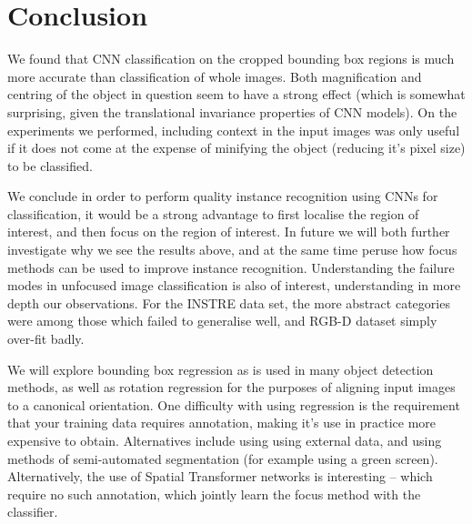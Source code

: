 \section{Conclusion}

We found that CNN classification on the cropped bounding box regions is much more accurate than classification of whole images. Both magnification and centring of the object in question seem to have a strong effect (which is somewhat surprising, given the translational invariance properties of CNN models). On the experiments we performed, including context in the input images was only useful if it does not come at the expense of minifying the object (reducing it's pixel size) to be classified.

We conclude in order to perform quality instance recognition using \gls{CNN}s for classification, it would be a strong advantage to first localise the region of interest, and then focus on the region of interest.  In future we will both further investigate why we see the results above, and at the same time peruse how focus methods can be used to improve instance recognition. Understanding the failure modes in unfocused image classification is also of interest, understanding in more depth our observations. For the INSTRE data set, the more abstract categories were among those which failed to generalise well, and RGB-D dataset simply over-fit badly.

We will explore bounding box regression as is used in many object detection methods, as well as rotation regression for the purposes of aligning input images to a canonical orientation. One difficulty with using regression is the requirement that your training data requires annotation, making it's use in practice more expensive to obtain. Alternatives include using using external data, and using methods of semi-automated segmentation (for example using a green screen). Alternatively, the use of Spatial Transformer networks is interesting -- which require no such annotation, which jointly learn the focus method with the classifier.




